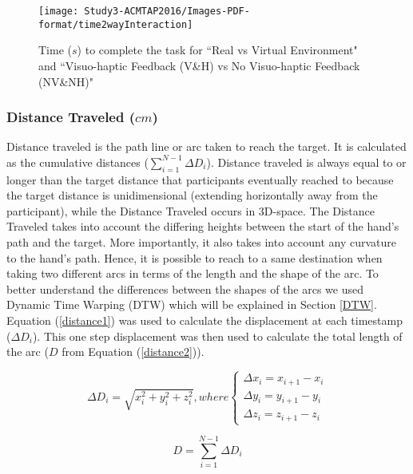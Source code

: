 \begin{figure}
	\centering
	\texttt{[image: Study3-ACMTAP2016/Images-PDF-format/time2wayInteraction]}
	\caption{Time ($s$) to complete the task for ``Real vs Virtual Environment" and ``Visuo-haptic Feedback (V\&H) vs No Visuo-haptic Feedback (NV\&NH)"}
	\label{fig:time2way}
\end{figure}

\subsubsection{Distance Traveled ($cm$)} \label{dist2way}
Distance traveled is the path line or arc taken to reach the target. It is calculated as the cumulative distances ($\sum_{i=1}^{N-1}\Delta D_i$). Distance traveled is always equal to or longer than the target distance that participants eventually reached to because the target distance is unidimensional (extending horizontally away from the participant), while the Distance Traveled occurs in 3D-space. The Distance Traveled takes into account the differing heights between the start of the hand's path and the target. More importantly, it also takes into account any curvature to the hand's path. Hence, it is possible to reach to a same destination when taking two different arcs in terms of the length and the shape of the arc. To better understand the differences between the shapes of the arcs we used Dynamic Time Warping (DTW) which will be explained in Section \ref{DTW}. Equation (\ref{distance1}) was used to calculate the displacement at each timestamp ($\Delta D_i$). This one step displacement was then used to calculate the total length of the arc ($D$ from Equation (\ref{distance2})). 

\begin{equation} \label{distance1}
\Delta D_i = \sqrt{x_i^2+y_i^2+z_i^2},  where  
\begin{cases}
\Delta x_i = x_{i+1}-x_{i} \\
\Delta y_i = y_{i+1}-y_{i} \\
\Delta z_i = z_{i+1}-z_{i} 
\end{cases}
\end{equation}


\begin{equation} \label{distance2}
D = \sum_{i=1}^{N-1}\Delta D_i 
\end{equation}


